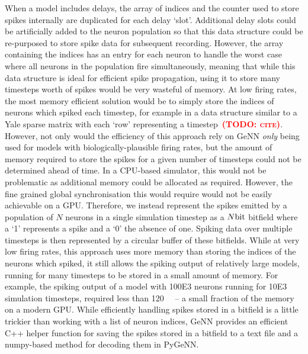 \documentclass[utf8]{frontiersSCNS} %
\newcommand{\todo}[1]{\textbf{\textsc{\textcolor{red}{(TODO: #1)}}}}
\begin{document}
When a model includes delays, the array of indices and the counter used to store spikes internally are duplicated for each delay `slot'.
Additional delay slots could be artificially added to the neuron population so that this data structure could be re-purposed to store spike data for subsequent recording.
However, the array containing the indices has an entry for each neuron to handle the worst case where all neurons in the population fire simultaneously, meaning that while this data structure is ideal for efficient spike propagation, using it to store many timesteps worth of spikes would be very wasteful of memory.
At low firing rates, the most memory efficient solution would be to simply store the indices of neurons which spiked each timestep, for example in a data structure similar to a Yale sparse matrix with each `row' representing a timestep~\todo{cite}.
However, not only would the efficiency of this approach rely on GeNN \emph{only} being used for models with biologically-plausible firing rates, but the amount of memory required to store the spikes for a given number of timesteps could not be determined ahead of time.
In a CPU-based simulator, this would not be problematic as additional memory could be allocated as required.
However, the fine grained global synchronisation this would require would not be easily achievable on a GPU.
Therefore, we instead represent the spikes emitted by a population of $N$ neurons in a single simulation timestep as a $N\si{\bit}$ bitfield where a `1' represents a spike and a `0' the absence of one.
Spiking data over multiple timesteps is then represented by a circular buffer of these bitfields.
While at very low firing rates, this approach uses more memory than storing the indices of the neurons which spiked, it still allows the spiking output of relatively large models, running for many timesteps to be stored in a small amount of memory.
For example, the spiking output of a model with \num{100E3} neurons running for \num{10E3} simulation timesteps, required less than \SI{120}{\mega\byte} -- a small fraction of the memory on a modern GPU.
While efficiently handling spikes stored in a bitfield is a little trickier than working with a list of neuron indices, GeNN provides an efficient C++ helper function for saving the spikes stored in a bitfield to a text file and a numpy-based method for decoding them in PyGeNN.
\end{document}
